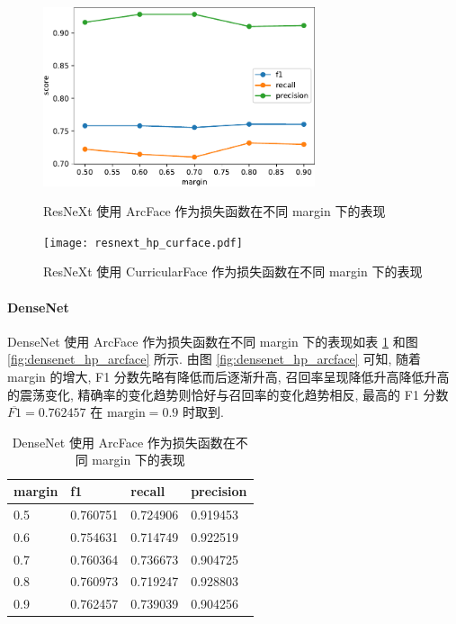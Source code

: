 \documentclass[12pt]{article}
\begin{document}
\begin{figure}[htbp]
  \centering
  \begin{minipage}[t]{0.48\textwidth}
    \centering
    \includegraphics[width=8cm]{resnext_hp_arcface.pdf}
    \caption{ResNeXt 使用 ArcFace 作为损失函数在不同 margin 下的表现}
    \label{fig:resnext_hp_arcface}
  \end{minipage}
  \begin{minipage}[t]{0.48\textwidth}
    \centering
    \texttt{[image: resnext\_hp\_curface.pdf]}
    \caption{ResNeXt 使用 CurricularFace 作为损失函数在不同 margin 下的表现}
    \label{fig:resnext_hp_curface}
  \end{minipage}
\end{figure}

\paragraph{DenseNet}

DenseNet 使用 ArcFace 作为损失函数在不同 margin 下的表现如表 \ref{tab:densenet_hp_arcface} 和图 \ref{fig:densenet_hp_arcface} 所示. 由图 \ref{fig:densenet_hp_arcface} 可知, 随着 margin 的增大, F1 分数先略有降低而后逐渐升高, 召回率呈现降低升高降低升高的震荡变化, 精确率的变化趋势则恰好与召回率的变化趋势相反, 最高的 F1 分数 $\overline{F1}=0.762457$ 在 $\text{margin} = 0.9$ 时取到.

\begin{table}[htbp]
  \centering
  \caption{DenseNet 使用 ArcFace 作为损失函数在不同 margin 下的表现}
  \label{tab:densenet_hp_arcface}
  \begin{tabular}{llll}
    \toprule
    margin & f1       & recall   & precision \\
    \midrule
    0.5 & 0.760751 & 0.724906 & 0.919453  \\
    0.6 & 0.754631 & 0.714749 & 0.922519  \\
    0.7 & 0.760364 & 0.736673 & 0.904725  \\
    0.8 & 0.760973 & 0.719247 & 0.928803  \\
    0.9 & 0.762457 & 0.739039 & 0.904256  \\
    \bottomrule
  \end{tabular}
\end{table}
\end{document}
